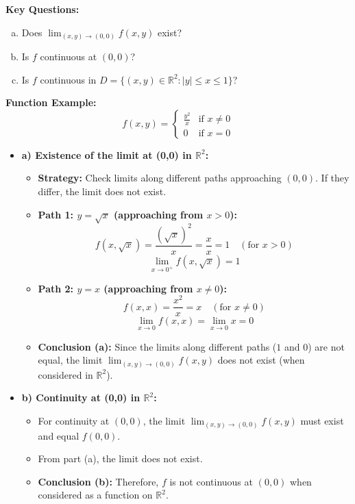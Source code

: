 \begin{cascade}
	\textbf{Key Questions:}
	\begin{enumerate}[a)]
		\item Does $\lim_{(x,y) \to (0,0)} f(x, y)$ exist?
		\item Is $f$ continuous at $(0,0)$?
		\item Is $f$ continuous in $D = \{(x,y) \in \mathbb{R}^2 : |y| \le x \le 1\}$?
	\end{enumerate}
	\textbf{Function Example:}
	\[ f(x, y) = \begin{cases} \frac{y^2}{x} & \text{if } x \neq 0 \\ 0 & \text{if } x = 0 \end{cases} \]
	\begin{itemize}
		\item \textbf{a) Existence of the limit at (0,0) in $\mathbb{R}^2$:}
		      \begin{itemize}
			      \item \textbf{Strategy:} Check limits along different paths approaching $(0,0)$. If they differ, the limit does not exist.
			      \item \textbf{Path 1: $y = \sqrt{x}$ (approaching from $x > 0$):}
			            \[ f(x, \sqrt{x}) = \frac{(\sqrt{x})^2}{x} = \frac{x}{x} = 1 \quad (\text{for } x > 0) \]
			            \[ \lim_{x \to 0^+} f(x, \sqrt{x}) = 1 \]
			      \item \textbf{Path 2: $y = x$ (approaching from $x \neq 0$):}
			            \[ f(x, x) = \frac{x^2}{x} = x \quad (\text{for } x \neq 0) \]
			            \[ \lim_{x \to 0} f(x, x) = \lim_{x \to 0} x = 0 \]
			      \item \textbf{Conclusion (a):} Since the limits along different paths ($1$ and $0$) are not equal, the limit $\lim_{(x,y) \to (0,0)} f(x, y)$ does not exist (when considered in $\mathbb{R}^2$).
		      \end{itemize}
		\item \textbf{b) Continuity at (0,0) in $\mathbb{R}^2$:}
		      \begin{itemize}
			      \item For continuity at $(0,0)$, the limit $\lim_{(x,y) \to (0,0)} f(x, y)$ must exist and equal $f(0,0)$.
			      \item From part (a), the limit does not exist.
			      \item \textbf{Conclusion (b):} Therefore, $f$ is not continuous at $(0,0)$ when considered as a function on $\mathbb{R}^2$.

\end{itemize}
\end{itemize}
\end{cascade}

